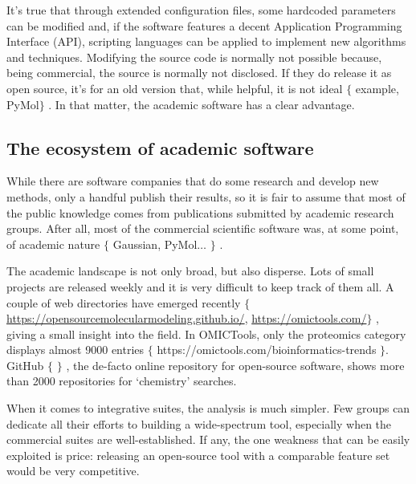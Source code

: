 It’s true that through extended configuration files, some hardcoded parameters can be modified and, if the software features a decent Application Programming Interface (API), scripting languages can be applied to implement new algorithms and techniques. Modifying the source code is normally not possible because, being commercial, the source is normally not disclosed. If they do release it as open source, it’s for an old version that, while helpful, it is not ideal $ \{ $ example, PyMol$ \} $ . In that matter, the academic software has a clear advantage.

\subsection{The ecosystem of academic software}
While there are software companies that do some research and develop new methods, only a handful publish their results, so it is fair to assume that most of the public knowledge comes from publications submitted by academic research groups. After all, most of the commercial scientific software was, at some point, of academic nature $ \{ $ Gaussian, PyMol$ \ldots $ $ \} $ .

The academic landscape is not only broad, but also disperse. Lots of small projects are released weekly and it is very difficult to keep track of them all. A couple of web directories have emerged recently $ \{ $ \href{https://opensourcemolecularmodeling.github.io/}{https://opensourcemolecularmodeling.github.io/}, \href{https://omictools.com/}{https://omictools.com/}$ \} $ , giving a small insight into the field. In OMICTools, only the proteomics category displays almost 9000 entries $ \{ $ https://omictools.com/bioinformatics-trends $ \} $. GitHub $ \{ $ $ \} $ , the de-facto online repository for open-source software, shows more than 2000 repositories for ‘chemistry’ searches.

When it comes to integrative suites, the analysis is much simpler. Few groups can dedicate all their efforts to building a wide-spectrum tool, especially when the commercial suites are well-established. If any, the one weakness that can be easily exploited is price: releasing an open-source tool with a comparable feature set would be very competitive.

